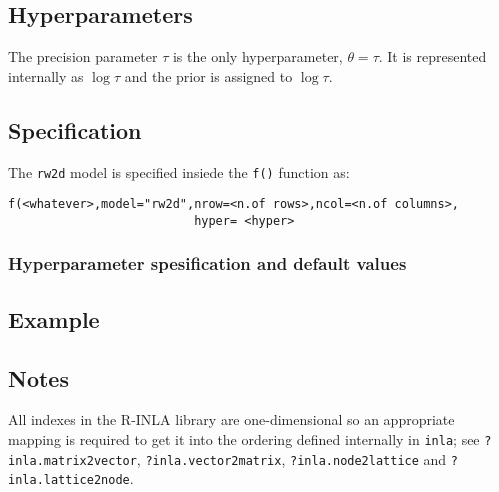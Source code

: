 \documentclass[a4paper,11pt]{article}
\begin{document}
\subsection*{Hyperparameters}

The precision parameter $\tau$ is the only hyperparameter, $\theta =
\tau$. It is represented internally as $\log\tau$ and the prior is
assigned to $\log\tau$.

\subsection*{Specification}

The {\tt rw2d} model is specified insiede the {\tt f()} function as:
\begin{verbatim}
f(<whatever>,model="rw2d",nrow=<n.of rows>,ncol=<n.of columns>,
                          hyper= <hyper>
\end{verbatim}

\subsubsection*{Hyperparameter spesification and default values}


\subsection*{Example}



\subsection*{Notes}
All indexes in the R-INLA library are one-dimensional so an
appropriate mapping is required to get it into the ordering defined
internally in \verb|inla|; see \verb|?inla.matrix2vector|,
\verb|?inla.vector2matrix|, \verb|?inla.node2lattice| and
\verb|?inla.lattice2node|.

{\small}
\end{document}
